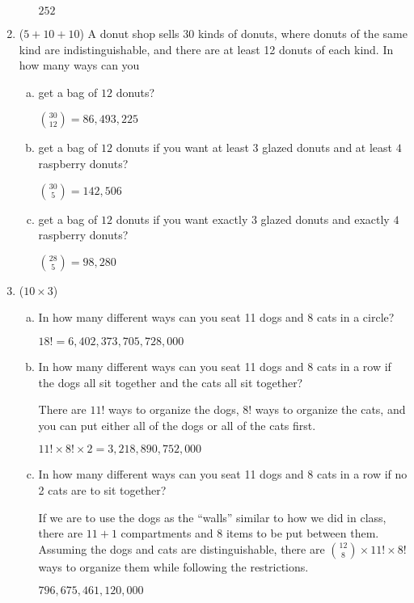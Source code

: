 \documentclass[12pt]{article}
\begin{document}
\begin{enumerate}
\begin{enumerate}[a.]
			$252$
		\end{enumerate}

		\newpage
		\item ($5 + 10 + 10$)
		A donut shop sells $30$ kinds of donuts, where donuts of the same kind are indistinguishable, and there are at least 12 donuts of each kind. In how many ways can you
		\begin{enumerate}[a.]
			\item get a bag of $12$ donuts?

			${30 \choose 12} = 86,493,225$

			\item get a bag of $12$ donuts if you want at least $3$ glazed donuts and at least $4$ raspberry donuts?

			${30 \choose 5} = 142,506$

			\item get a bag of $12$ donuts if you want exactly $3$ glazed donuts and exactly $4$ raspberry donuts?

			${28 \choose 5} = 98,280$
		\end{enumerate}

		\newpage
		\item ($10 \times 3$)
		\begin{enumerate}[a.]
			\item
			In how many different ways can you seat 11 dogs and 8 cats in a circle?

			$18! = 6,402,373,705,728,000$

			\item
			In how many different ways can you seat 11 dogs and 8 cats in a row if the dogs all sit together and the cats all sit together?

			There are $11!$ ways to organize the dogs, $8!$ ways to organize the cats, and you can put either all of the dogs or all of the cats first.

			$11! \times 8! \times 2 = 3,218,890,752,000$
			\item
			In how many different ways can you seat 11 dogs and 8 cats in a row if no 2 cats are to sit together?

			If we are to use the dogs as the ``walls'' similar to how we did in class, there are $11+1$ compartments and $8$ items to be put between them. Assuming the dogs and cats are distinguishable, there are ${12 \choose 8} \times 11! \times 8!$ ways to organize them while following the restrictions.

			$796,675,461,120,000$
		\end{enumerate}
	\end{enumerate}
\end{document}
